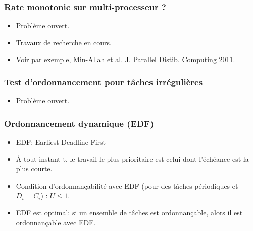 \documentclass[ignorenonframetext,]{beamer}
\begin{document}
\begin{frame}\frametitle{Rate monotonic sur multi-processeur ?}

\begin{itemize}
\item
  Problème ouvert.
\item
  Travaux de recherche en cours.
\item
  Voir par exemple, Min-Allah et al. J. Parallel Distib. Computing 2011.
\end{itemize}

\end{frame}

\begin{frame}\frametitle{Test d'ordonnancement pour tâches irrégulières}

\begin{itemize}
\item
  Problème ouvert.
\end{itemize}

\end{frame}

\begin{frame}\frametitle{Ordonnancement dynamique (EDF)}

\begin{itemize}
\item
  EDF: Earliest Deadline First
\item
  À tout instant t, le travail le plus prioritaire est celui dont
  l'échéance est la plus courte.
\item
  Condition d'ordonnançabilité avec EDF (pour des tâches périodiques et
  $D_i = C_i$) : $U \leq 1$.
\item
  EDF est optimal: si un ensemble de tâches est ordonnançable, alors il
  est ordonnançable avec EDF.
\end{itemize}

\end{frame}
\end{document}
